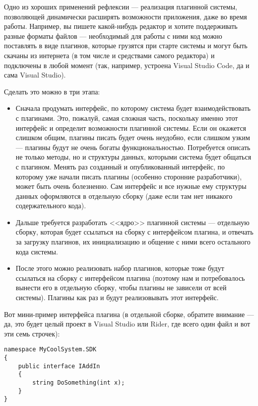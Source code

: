 \documentclass{../../text-style}
\begin{document}
Одно из хороших применений рефлексии --- реализация плагинной системы, позволяющей динамически расширять возможности приложения, даже во время работы. Например, вы пишете какой-нибудь редактор и хотите поддерживать разные форматы файлов --- необходимый для работы с ними код можно поставлять в виде плагинов, которые грузятся при старте системы и могут быть скачаны из интернета (в том числе и средствами самого редактора) и подключены в любой момент (так, например, устроена Visual Studio Code, да и сама Visual Studio). 

Сделать это можно в три этапа:
\begin{itemize}
    \item Сначала продумать интерфейс, по которому система будет взаимодействовать с плагинами. Это, пожалуй, самая сложная часть, поскольку именно этот интерфейс и определит возможности плагинной системы. Если он окажется слишком общим, плагины писать будет очень неудобно, если слишком узким --- плагины будут не очень богаты функциональностью. Потребуется описать не только методы, но и структуры данных, которыми система будет общаться с плагином. Менять раз созданный и опубликованный интерфейс, по которому уже начали писать плагины (особенно сторонние разработчики), может быть очень болезненно. Сам интерфейс и все нужные ему структуры данных оформляются в отдельную сборку (даже если там нет никакого содержательного кода).
    \item Дальше требуется разработать <<ядро>> плагинной системы --- отдельную сборку, которая будет ссылаться на сборку с интерфейсом плагина, и отвечать за загрузку плагинов, их инициализацию и общение с ними всего остального кода системы.
    \item После этого можно реализовать набор плагинов, которые тоже будут ссылаться на сборку с интерфейсом плагина (поэтому нам и потребовалось вынести его в отдельную сборку, чтобы плагины не зависели от всей системы). Плагины как раз и будут реализовывать этот интерфейс.
\end{itemize}

Вот мини-пример интерфейса плагина (в отдельной сборке, обратите внимание --- да, это будет целый проект в Visual Studio или Rider, где всего один файл и вот эти семь строчек):

\begin{verbatim}
namespace MyCoolSystem.SDK 
{
    public interface IAddIn 
    {
        string DoSomething(int x);
    }
}
\end{verbatim}
\end{document}
